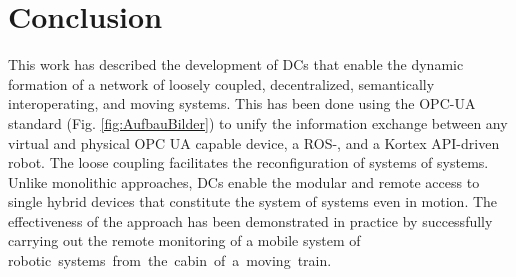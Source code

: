 \documentclass[conference]{IEEEtran}
\begin{document}
\section{Conclusion}
This work has described the development of DCs that enable the dynamic formation of a network of loosely coupled, decentralized, semantically interoperating, and moving systems.  This has been done using the OPC-UA standard (Fig. \ref{fig:AufbauBilder}) to unify the information exchange between any virtual and physical OPC UA capable device, a ROS-, and a Kortex API-driven robot. The loose coupling facilitates the reconfiguration of systems of systems. Unlike monolithic approaches, DCs enable the modular and remote access to  single hybrid devices that constitute the system of systems even in motion. The effectiveness of the approach has been demonstrated in practice by successfully carrying out the remote monitoring of a mobile system of \mbox{robotic systems from the cabin of a moving train.}%

\end{document}
